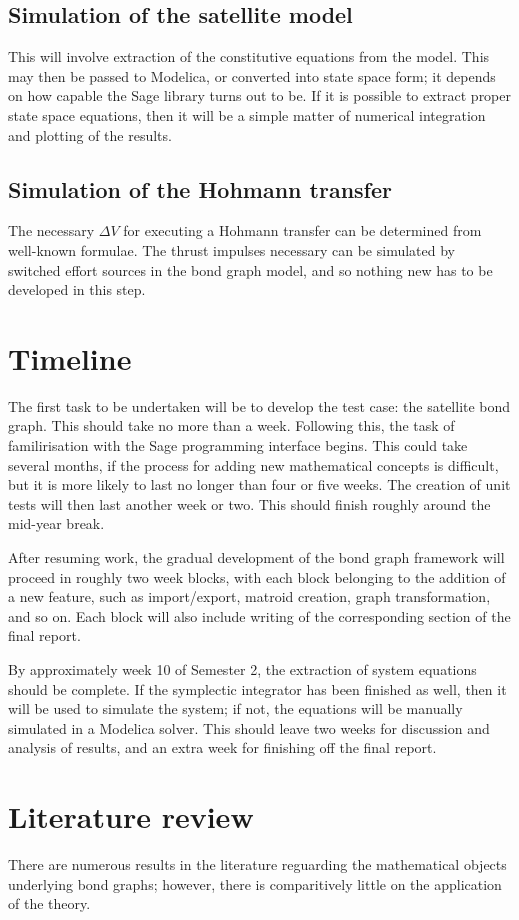 \documentclass[utf8,a4paper,12pt]{report}
\begin{document}
\section{Simulation of the satellite model}
This will involve extraction of the constitutive equations from the model. This may then be passed to Modelica, or converted into state space form; it depends on how capable the Sage library turns out to be. If it is possible to extract proper state space equations, then it will be a simple matter of numerical integration and plotting of the results.

\section{Simulation of the Hohmann transfer}
The necessary $\Delta V$ for executing a Hohmann transfer can be determined from well-known formulae. The thrust impulses necessary can be simulated by switched effort sources in the bond graph model, and so nothing new has to be developed in this step.

\chapter{Timeline}
The first task to be undertaken will be to develop the test case: the satellite bond graph. This should take no more than a week. Following this, the task of familirisation with the Sage programming interface begins. This could take several months, if the process for adding new mathematical concepts is difficult, but it is more likely to last no longer than four or five weeks. The creation of unit tests will then last another week or two. This should finish roughly around the mid-year break. 

After resuming work, the gradual development of the bond graph framework will proceed in roughly two week blocks, with each block belonging to the addition of a new feature, such as import/export, matroid creation, graph transformation, and so on. Each block will also include writing of the corresponding section of the final report.

By approximately week 10 of Semester 2, the extraction of system equations should be complete. If the symplectic integrator has been finished as well, then it will be used to simulate the system; if not, the equations will be manually simulated in a Modelica solver. This should leave two weeks for discussion and analysis of results, and an extra week for finishing off the final report.
\chapter{Literature review}
There are numerous results in the literature reguarding the mathematical objects underlying bond graphs; however, there is comparitively little on the application of the theory.
\end{document}
